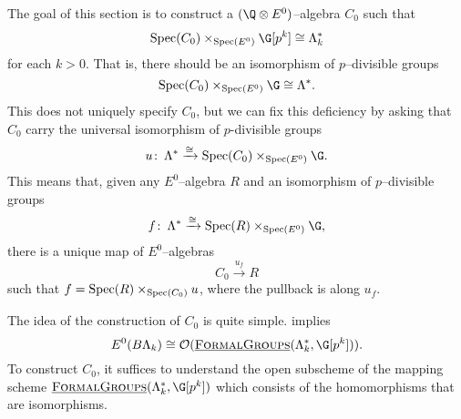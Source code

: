 The goal of this section is to construct a \((\Q \otimes E^0)\)--algebra \(C_0\) such that
\[
\Spec(C_0) \times_{\Spec(E^0)} \G[p^k] \cong \Lambda_{k}^*
\]
for each \(k>0\). That is, there should be an isomorphism of \(p\)--divisible groups
\[
\Spec(C_0) \times_{\Spec(E^0)} \G \cong \Lambda^*.
\]
This does not uniquely specify \(C_0\), but we can fix this deficiency by asking that \(C_0\) carry the universal isomorphism of \(p\)-divisible groups 
\[
u \co \Lambda^* \xrightarrow{\cong} \Spec(C_0) \times_{\Spec(E^0)} \G.
\]
This means that, given any \(E^0\)--algebra \(R\) and an isomorphism of \(p\)--divisible groups
\[
f \co \Lambda^* \xrightarrow{\cong} \Spec(R) \times_{\Spec(E^0)} \G,
\]
there is a unique map of \(E^0\)--algebras
\[
C_0 \xrightarrow{u_f} R
\]
such that \(f = \operatorname{Spec}(R) \times_{\operatorname{Spec}(C_0)} u\), where the pullback is along \(u_f\).

The idea of the construction of \(C_0\) is quite simple.   implies \[E^0(B\Lk) \cong \sheaf O(\InternalHom{FormalGroups}(\Lk^*,\G[p^k])).\]  To construct \(C_0\), it suffices to understand the open subscheme of the mapping scheme \(\InternalHom{FormalGroups}(\Lk^*,\G[p^k])\) which consists of the homomorphisms that are isomorphisms. 

